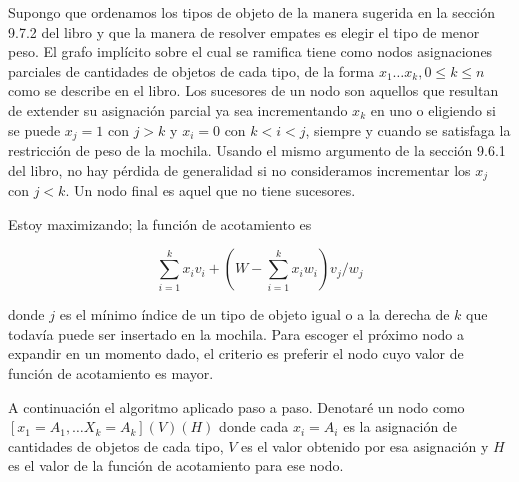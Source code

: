 \documentclass{article}
\begin{document}
Supongo que ordenamos los tipos de objeto de la manera sugerida en la sección 9.7.2 del libro y que la manera
de resolver empates es elegir el tipo de menor peso.
El grafo implícito sobre el cual se ramifica tiene como nodos asignaciones parciales de cantidades
de objetos de cada tipo, de la forma $x_1 \ldots x_k, 0 \leq k \leq n$ como se describe en el libro. Los sucesores
de un nodo son aquellos que resultan de extender su asignación parcial ya sea incrementando $x_k$ en uno o
eligiendo si se puede $x_j = 1$ con $j > k$ y $x_i = 0$ con $k < i < j$, siempre y cuando se satisfaga la 
restricción de peso de la mochila.
Usando el mismo argumento de la sección 9.6.1 del libro, no hay pérdida de generalidad
si no consideramos incrementar los $x_j$ con $j < k$. Un nodo final es aquel que no tiene sucesores.

Estoy maximizando; la función de acotamiento es

$$
\sum_{i=1}^k x_i v_i + \left( W - \sum_{i=1}^k x_i w_i \right) v_{j}/w_{j}
$$

donde $j$ es el mínimo índice de un tipo de objeto igual o a la derecha de $k$ que todavía
puede ser insertado en la mochila. Para escoger el próximo nodo a expandir en un momento dado, el criterio es
preferir el nodo cuyo valor de función de acotamiento es mayor.

A continuación el algoritmo aplicado paso a paso. Denotaré un nodo como $[x_1=A_1, \ldots X_k=A_k] (V)(H)$ donde
cada $x_i = A_i$ es la asignación de cantidades de objetos de cada tipo, $V$ es el valor obtenido por esa asignación y $H$ es el valor
de la función de acotamiento para ese nodo.

\renewcommand{\labelenumi}{\arabic{enumi}.}
\end{document}
